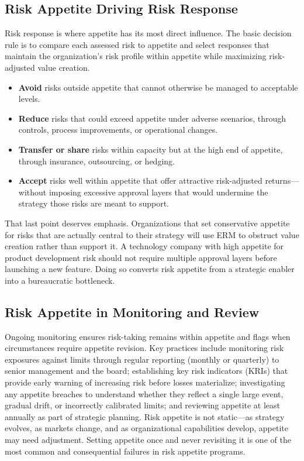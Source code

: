 \documentclass[11pt,openany]{book}
\begin{document}
\subsection{Risk Appetite Driving Risk Response}
\label{subsec:appetite-response}

Risk response is where appetite has its most direct influence. The basic
decision rule is to compare each assessed risk to appetite and select responses
that maintain the organization's risk profile within appetite while maximizing
risk-adjusted value creation.

\begin{itemize}
  \item \textbf{Avoid} risks outside appetite that cannot otherwise be managed
        to acceptable levels.
  \item \textbf{Reduce} risks that could exceed appetite under adverse scenarios,
        through controls, process improvements, or operational changes.
  \item \textbf{Transfer or share} risks within capacity but at the high end of
        appetite, through insurance, outsourcing, or hedging.
  \item \textbf{Accept} risks well within appetite that offer attractive
        risk-adjusted returns---without imposing excessive approval layers that
        would undermine the strategy those risks are meant to support.
\end{itemize}

That last point deserves emphasis. Organizations that set conservative appetite
for risks that are actually central to their strategy will use ERM to obstruct
value creation rather than support it. A technology company with high appetite
for product development risk should not require multiple approval layers before
launching a new feature. Doing so converts risk appetite from a strategic
enabler into a bureaucratic bottleneck.

\subsection{Risk Appetite in Monitoring and Review}
\label{subsec:appetite-monitoring}

Ongoing monitoring ensures risk-taking remains within appetite and flags when
circumstances require appetite revision. Key practices include monitoring risk
exposures against limits through regular reporting (monthly or quarterly) to
senior management and the board; establishing key risk indicators (KRIs) that
provide early warning of increasing risk before losses materialize; investigating
any appetite breaches to understand whether they reflect a single large event,
gradual drift, or incorrectly calibrated limits; and reviewing appetite at least
annually as part of strategic planning. Risk appetite is not static---as
strategy evolves, as markets change, and as organizational capabilities develop,
appetite may need adjustment. Setting appetite once and never revisiting it is
one of the most common and consequential failures in risk appetite programs.
\end{document}

